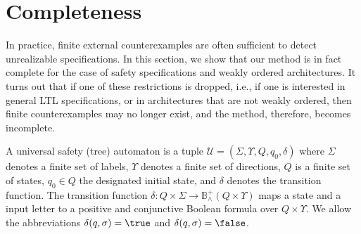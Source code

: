 \documentclass{LMCS}
\theoremstyle{plain}\newtheorem{theorem}[thm]{Theorem}
\theoremstyle{plain}\newtheorem{lemma}[thm]{Lemma}
\theoremstyle{plain}\newtheorem{proposition}[thm]{Proposition}
\theoremstyle{plain}\newtheorem{corollary}[thm]{Corollary}
\theoremstyle{definition}\newtheorem{definition}{Definition}[section]
\begin{document}
\begin{comment}
  \node[treenode,right=4cm of tree2](tree3) {}
child {
      child {
        child {
          node[treenode]{} edge from parent node[left,align=right]{$\neg g_{23}$\\$g_{32}$}
        }
        node[treenode]{} edge from parent node[left,align=right]{$g_{12}$\\$g_{13}$}
      }
      node[treenode]{} edge from parent node[left]{$v$}
    }
    child {
      child {
        child {
          node[treenode]{} edge from parent node[right,align=left]{$g_{23}$\\$\neg g_{32}$}
        }
        node[treenode]{} edge from parent node[right,align=left]{$\neg g_{12}$\\$\neg g_{13}$}
      }
      node[treenode]{} edge from parent node[right]{$\neg v$}
    }
    ;

  \node[above of=tree3] {(1,3)};

\end{tikzpicture} \caption[]{Path selection for counter example when assuming that all correct nodes use the identity input-output encoding}
\label{fig:byzantine_path_selection}
\end{figure}
\end{comment}

\section{Completeness} \label{sec:completeness}


In practice, finite external counterexamples are often sufficient to detect unrealizable specifications. In this section, we show that our method is in fact complete for the case of safety specifications and weakly ordered architectures. 
It turns out that if one of these restrictions is dropped, i.e., if one is interested in general LTL specifications, or in architectures that are not weakly ordered, then finite counterexamples may no longer exist, and the method, therefore, becomes incomplete.



A universal safety (tree) automaton is a tuple $\mathcal{U} = (\Sigma, \Upsilon, Q, q_0, \delta)$ where $\Sigma$ denotes a finite set of labels, $\Upsilon$ denotes a finite set of directions, $Q$ is a finite set of states, $q_0 \in Q$ the designated initial state, and $\delta$ denotes the transition function.
The transition function $\delta : Q \times \Sigma \rightarrow \mathbb{B}^+_\wedge(Q \times \Upsilon)$ maps a state and a input letter to a positive and conjunctive Boolean formula over $Q \times \Upsilon$.
We allow the abbreviations $\delta(q,\sigma) = \true$ and $\delta(q,\sigma) = \false$.
\end{document}
